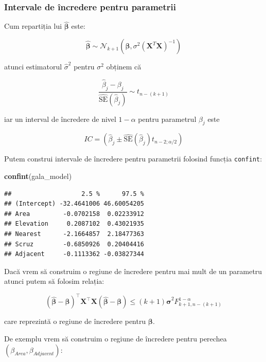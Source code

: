 \documentclass[]{article}
\newenvironment{Shaded}{\begin{snugshade}}{\end{snugshade}}
\newcommand{\KeywordTok}[1]{\textcolor[rgb]{0.13,0.29,0.53}{\textbf{{#1}}}}
\newcommand{\NormalTok}[1]{{#1}}
\begin{document}
\subsubsection{Intervale de încredere pentru
parametrii}\label{intervale-de-incredere-pentru-parametrii}

Cum repartiția lui \(\hat{\boldsymbol{\beta}}\) este:

\[
\hat{\boldsymbol{\beta}}\sim\mathcal{N}_{k+1}\left(\boldsymbol\beta,\sigma^2(\mathbf{X}^T\mathbf{X})^{-1}\right)
\]

atunci estimatorul \(\hat\sigma^2\) pentru \(\sigma^2\) obținem că

\[
\frac{\hat\beta_j-\beta_j}{\hat{\mathrm{SE}}(\hat\beta_j)}\sim t_{n-(k+1)}
\]

iar un interval de încredere de nivel \(1-\alpha\) pentru parametrul
\(\beta_j\) este

\[
IC = \left(\hat\beta_j\pm\hat{\mathrm{SE}}(\hat\beta_j)t_{n-2;\alpha/2}\right)
\]

Putem construi intervale de încredere pentru parametrii folosind funcția
\texttt{confint}:

\begin{Shaded}
\begin{Highlighting}[]
\KeywordTok{confint}\NormalTok{(gala_model)}
\end{Highlighting}
\end{Shaded}

\begin{verbatim}
##                   2.5 %      97.5 %
## (Intercept) -32.4641006 46.60054205
## Area         -0.0702158  0.02233912
## Elevation     0.2087102  0.43021935
## Nearest      -2.1664857  2.18477363
## Scruz        -0.6850926  0.20404416
## Adjacent     -0.1113362 -0.03827344
\end{verbatim}

Dacă vrem să construim o regiune de încredere pentru mai mult de un
parametru atunci putem să folosim relația:

\[
(\hat{\boldsymbol \beta} - \boldsymbol \beta)^\intercal\boldsymbol X^\intercal \boldsymbol X (\hat{\boldsymbol \beta} - \boldsymbol \beta)\leq (k+1)\hat{\boldsymbol \sigma}^2F_{k+1, n-(k+1)}^{1-\alpha}
\]

care reprezintă o regiune de încredere pentru \(\boldsymbol \beta\).

De exemplu vrem să construim o regiune de încredere pentru perechea
\((\beta_{Area},\beta_{Adjacent})\):
\end{document}

